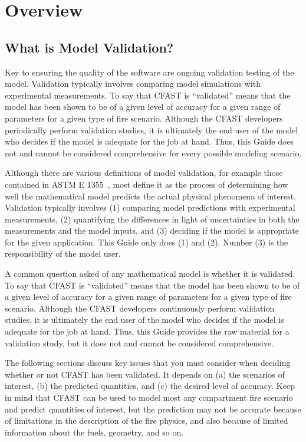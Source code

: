 
\chapter{Overview}



\section{What is Model Validation?}

Key to ensuring the quality of the software are ongoing validation testing of the model. Validation typically involves comparing model simulations with experimental measurements. To say that CFAST is ``validated'' means that the model has been shown to be of a given level of accuracy for a given range of parameters for a given type of fire scenario. Although the CFAST developers periodically perform validation studies, it is ultimately the end user of the model who decides if the model is adequate for the job at hand. Thus, this Guide does not and cannot be considered comprehensive for every possible modeling scenario.

Although there are various definitions of model validation, for example those contained in
ASTM E 1355~\cite{ASTM:E1355}, most define it as the process of determining how well the mathematical model
predicts the actual physical phenomena of interest.
Validation typically involves (1) comparing model predictions with experimental measurements, (2) quantifying the differences in light of uncertainties in
both the measurements and the model inputs, and (3) deciding if the model is appropriate for the given application. This Guide only does (1) and (2). Number (3) is
the responsibility of the model user.

A common question asked of any mathematical model is whether it is validated. To say that CFAST is
``validated'' means that the model has been shown to be of a given level of accuracy for a given range of parameters for a given
type of fire scenario. Although the CFAST developers continuously perform validation studies, it is ultimately the end user of the model who
decides if the model is adequate for the job at hand. Thus, this Guide provides the raw material for a validation study, but it does not
and cannot be considered comprehensive.

The following sections discuss key issues that you must consider when deciding whether or not CFAST has been validated. It depends on (a) the scenarios
of interest, (b) the predicted quantities, and (c) the desired level of accuracy. Keep in mind that CFAST can be used to model most any compartment fire scenario and predict
quantities of interest, but the prediction may not be accurate because of limitations in the description of the fire physics, and also because of limited
information about the fuels, geometry, and so on.


